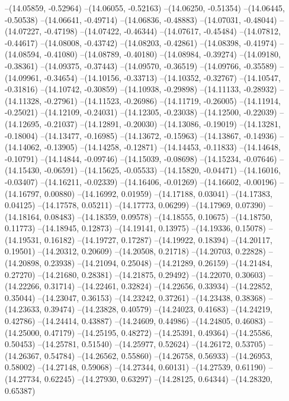--(14.05859, -0.52964)
--(14.06055, -0.52163)
--(14.06250, -0.51354)
--(14.06445, -0.50538)
--(14.06641, -0.49714)
--(14.06836, -0.48883)
--(14.07031, -0.48044)
--(14.07227, -0.47198)
--(14.07422, -0.46344)
--(14.07617, -0.45484)
--(14.07812, -0.44617)
--(14.08008, -0.43742)
--(14.08203, -0.42861)
--(14.08398, -0.41974)
--(14.08594, -0.41080)
--(14.08789, -0.40180)
--(14.08984, -0.39274)
--(14.09180, -0.38361)
--(14.09375, -0.37443)
--(14.09570, -0.36519)
--(14.09766, -0.35589)
--(14.09961, -0.34654)
--(14.10156, -0.33713)
--(14.10352, -0.32767)
--(14.10547, -0.31816)
--(14.10742, -0.30859)
--(14.10938, -0.29898)
--(14.11133, -0.28932)
--(14.11328, -0.27961)
--(14.11523, -0.26986)
--(14.11719, -0.26005)
--(14.11914, -0.25021)
--(14.12109, -0.24031)
--(14.12305, -0.23038)
--(14.12500, -0.22039)
--(14.12695, -0.21037)
--(14.12891, -0.20030)
--(14.13086, -0.19019)
--(14.13281, -0.18004)
--(14.13477, -0.16985)
--(14.13672, -0.15963)
--(14.13867, -0.14936)
--(14.14062, -0.13905)
--(14.14258, -0.12871)
--(14.14453, -0.11833)
--(14.14648, -0.10791)
--(14.14844, -0.09746)
--(14.15039, -0.08698)
--(14.15234, -0.07646)
--(14.15430, -0.06591)
--(14.15625, -0.05533)
--(14.15820, -0.04471)
--(14.16016, -0.03407)
--(14.16211, -0.02339)
--(14.16406, -0.01269)
--(14.16602, -0.00196)
--(14.16797, 0.00880)
--(14.16992, 0.01959)
--(14.17188, 0.03041)
--(14.17383, 0.04125)
--(14.17578, 0.05211)
--(14.17773, 0.06299)
--(14.17969, 0.07390)
--(14.18164, 0.08483)
--(14.18359, 0.09578)
--(14.18555, 0.10675)
--(14.18750, 0.11773)
--(14.18945, 0.12873)
--(14.19141, 0.13975)
--(14.19336, 0.15078)
--(14.19531, 0.16182)
--(14.19727, 0.17287)
--(14.19922, 0.18394)
--(14.20117, 0.19501)
--(14.20312, 0.20609)
--(14.20508, 0.21718)
--(14.20703, 0.22828)
--(14.20898, 0.23938)
--(14.21094, 0.25048)
--(14.21289, 0.26159)
--(14.21484, 0.27270)
--(14.21680, 0.28381)
--(14.21875, 0.29492)
--(14.22070, 0.30603)
--(14.22266, 0.31714)
--(14.22461, 0.32824)
--(14.22656, 0.33934)
--(14.22852, 0.35044)
--(14.23047, 0.36153)
--(14.23242, 0.37261)
--(14.23438, 0.38368)
--(14.23633, 0.39474)
--(14.23828, 0.40579)
--(14.24023, 0.41683)
--(14.24219, 0.42786)
--(14.24414, 0.43887)
--(14.24609, 0.44986)
--(14.24805, 0.46083)
--(14.25000, 0.47179)
--(14.25195, 0.48272)
--(14.25391, 0.49364)
--(14.25586, 0.50453)
--(14.25781, 0.51540)
--(14.25977, 0.52624)
--(14.26172, 0.53705)
--(14.26367, 0.54784)
--(14.26562, 0.55860)
--(14.26758, 0.56933)
--(14.26953, 0.58002)
--(14.27148, 0.59068)
--(14.27344, 0.60131)
--(14.27539, 0.61190)
--(14.27734, 0.62245)
--(14.27930, 0.63297)
--(14.28125, 0.64344)
--(14.28320, 0.65387)
